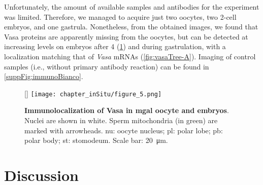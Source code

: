 Unfortunately, the amount of available samples and antibodies for the experiment was limited. Therefore, we managed to acquire just two oocytes, two 2-cell embryos, and one gastrula. Nonetheless, from the obtained images, we found that Vasa proteins are apparently missing from the oocytes, but can be detected at increasing levels on embryos after \qty{4}{\hpf} (\cref{fig:immuno}) and during gastrulation, with a localization matching that of \textit{Vasa} mRNAs (\cref{fig:vasaTree-A}). Imaging of control samples (i.e., without primary antibody reaction) can be found in \cref{suppFig:immunoBianco}.

\begin{figure}
	[\FBwidth]
	{\texttt{[image: chapter\_inSitu/figure\_5.png]}}
	{\caption[\textbf{Immunolocalization of Vasa in \gls{mgal} oocyte and embryos}]
		{
			\textbf{Immunolocalization of Vasa in \gls{mgal} oocyte and embryos}. Nuclei are shown in white. Sperm mitochondria (in green) are marked with arrowheads. nu: oocyte nucleus; pl: polar lobe; pb: polar body; st: stomodeum. Scale bar: \qty{20}{\um}.
		}
		\label{fig:immuno}}
\end{figure}

\section{Discussion} \label{chapter:insitu-discussion}
